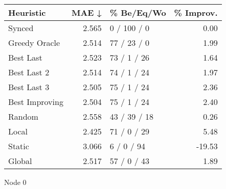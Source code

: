 \begin{tabular}{lrlr}
\toprule
\textbf{Heuristic} & \textbf{MAE ↓} & \textbf{\% Be/Eq/Wo} & \textbf{\% Improv.} \\
\midrule
            Synced &          2.565 &          0 / 100 / 0 &                0.00 \\
     Greedy Oracle &          2.514 &          77 / 23 / 0 &                1.99 \\
         Best Last &          2.523 &          73 / 1 / 26 &                1.64 \\
       Best Last 2 &          2.514 &          74 / 1 / 24 &                1.97 \\
       Best Last 3 &          2.505 &          75 / 1 / 24 &                2.36 \\
    Best Improving &          2.504 &          75 / 1 / 24 &                2.40 \\
            Random &          2.558 &         43 / 39 / 18 &                0.26 \\
             Local &          2.425 &          71 / 0 / 29 &                5.48 \\
            Static &          3.066 &           6 / 0 / 94 &              -19.53 \\
            Global &          2.517 &          57 / 0 / 43 &                1.89 \\
\bottomrule
\end{tabular}
\caption{Node 0}
\label{tab:ds_non_lr01_le1_bs4_0}
